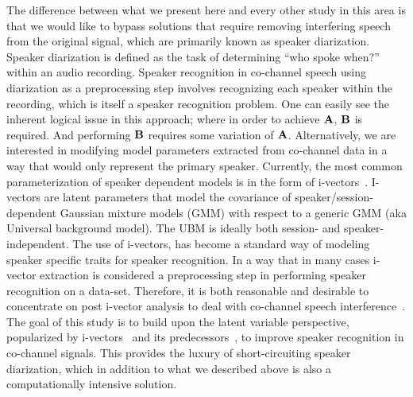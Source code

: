 \documentclass[journal]{IEEEtran}
\begin{document}
The difference between what we present here and every other study in this area is that we would like to bypass solutions that require removing interfering speech from the original signal, which are primarily known as speaker diarization. Speaker diarization is defined as the task of determining ``who spoke when?'' within an audio recording. 
Speaker recognition in co-channel speech using diarization as a preprocessing step involves recognizing each speaker within the recording, which is itself a speaker recognition problem. 
One can easily see the inherent logical issue in this approach; where in order to achieve $\bf A$, $\bf B$ is required. And performing $\bf B$ requires some variation of $\bf A$.
Alternatively, we are interested in modifying model parameters extracted from co-channel data in a way that would only represent the primary speaker. 
Currently, the most common parameterization of speaker dependent models is in the form of i-vectors~\cite{najeem_frontendanalysis}. 
I-vectors are latent parameters that model the covariance of speaker/session-dependent Gaussian mixture models (GMM) with respect to a generic GMM (aka Universal background model). The UBM is ideally both session- and speaker-independent.
The use of i-vectors, has become a standard way of modeling speaker specific traits for speaker recognition. 
In a way that in many cases i-vector extraction is considered a preprocessing step in performing speaker recognition on a data-set. 
Therefore, it is both reasonable and desirable to concentrate on post i-vector analysis to deal with co-channel speech interference~\cite{ivector_challenge}. 
The goal of this study is to build upon the latent variable perspective, popularized by i-vectors~\cite{najeem_frontendanalysis} and its predecessors~\cite{kenny_jfa}, to improve speaker recognition in co-channel signals. 
This provides the luxury of short-circuiting speaker diarization, which in addition to what we described above is also a computationally intensive solution. 
\end{document}

